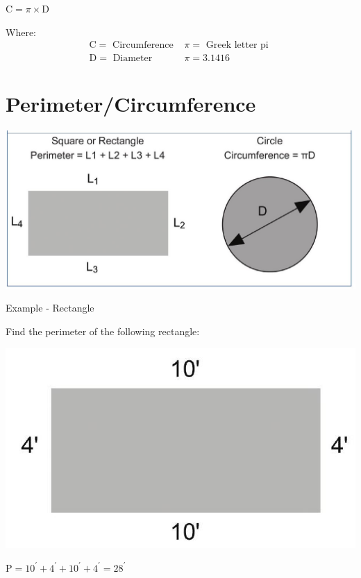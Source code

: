 \documentclass[10pt]{article}
\begin{document}
$\mathrm{C}=\pi \times \mathrm{D}$

Where:
$$
\begin{array}{ll}
\mathrm{C}=\text { Circumference } & \pi=\text { Greek letter pi } \\
\mathrm{D}=\text { Diameter } & \pi=3.1416
\end{array}
$$

\section{Perimeter/Circumference}
\includegraphics[max width=\textwidth]{2022_09_11_72dbedc910e6e984560cg-25}

Example - Rectangle

Find the perimeter of the following rectangle:

\includegraphics[max width=\textwidth]{2022_09_11_72dbedc910e6e984560cg-25(1)}

$\mathrm{P}=10^{\prime}+4^{\prime}+10^{\prime}+4^{\prime}=28^{\prime}$
\end{document}
